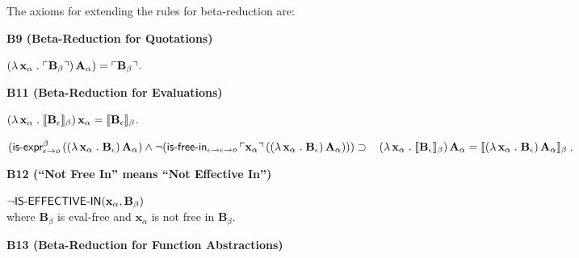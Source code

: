 \documentclass[fleqn]{llncs}
\begin{document}
\medskip

\noindent
The axioms for extending the rules  for beta-reduction are:

\medskip

\noindent
\begin{minipage}{\textwidth}
  \noindent\textbf{B9 (Beta-Reduction for Quotations)}

  \be

    \item[] $(\lambda\, \textbf{x}_\alpha \mathrel.
      \ulcorner\textbf{B}_\beta\urcorner) \, \textbf{A}_\alpha) =
      \ulcorner\textbf{B}_\beta\urcorner$.

  \ee

  \noindent\textbf{B11 (Beta-Reduction for Evaluations)}
  \be

    \item $(\lambda\, \textbf{x}_\alpha \mathrel.
      \llbracket\textbf{B}_\epsilon\rrbracket_\beta) \, \textbf{x}_\alpha =
      \llbracket\textbf{B}_\epsilon\rrbracket_\beta$.
 
    \item $(\mname{is-expr}_{\epsilon \tarrow o}^{\beta} \,
      ((\LambdaApp \textbf{x}_\alpha \mdot \textbf{B}_\epsilon) \,
      \textbf{A}_\alpha) \And %
      \Neg(\mname{is-free-in}_{\epsilon \tarrow \epsilon \tarrow o}
      \, \synbrack{\textbf{x}_\alpha} \, ((\LambdaApp
      \textbf{x}_\alpha \mdot \textbf{B}_\epsilon) \,
      \textbf{A}_\alpha))) \Implies \\[.5ex]
      \hspace*{2ex} (\LambdaApp \textbf{x}_\alpha \mdot
      \sembrack{\textbf{B}_\epsilon}_\beta) \, \textbf{A}_\alpha =
      \sembrack{(\LambdaApp \textbf{x}_\alpha \mdot
        \textbf{B}_\epsilon) \, \textbf{A}_\alpha}_\beta$.

  \ee

  \noindent\textbf{B12 (``Not Free In'' means ``Not Effective In'')}

  \bi

    \item[] $\neg\mbox{\sf IS-EFFECTIVE-IN}(\textbf{x}_\alpha,\textbf{B}_\beta)$\\
      where $\textbf{B}_\beta$ is eval-free and
      $\textbf{x}_\alpha$ is not free in $\textbf{B}_\beta$.

  \ei

  \noindent\textbf{B13 (Beta-Reduction for Function Abstractions)}

  \bi


\end{minipage}
\end{document}

